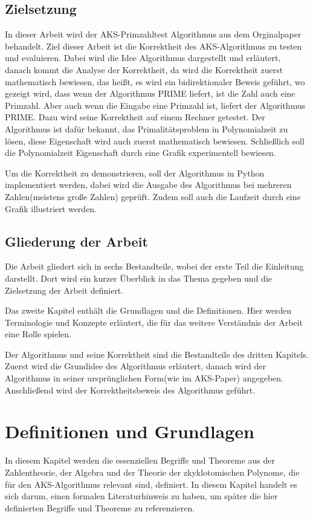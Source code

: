 \documentclass[12pt,oneside]{article}
\theoremstyle{remark}
\theoremstyle{definition}
\begin{document}
\subsection{Zielsetzung}
In dieser Arbeit wird der AKS-Primzahltest Algorithmus aus dem Orginalpaper behandelt. Ziel dieser Arbeit ist die Korrektheit des AKS-Algorithmus zu testen und evaluieren. Dabei wird die Idee Algorithmus dargestellt und erläutert, danach kommt die Analyse der Korrektheit, da wird die Korrektheit zuerst mathematisch bewiesen, das heißt, es wird ein bidirektionaler Beweis geführt, wo gezeigt wird, dass wenn der Algorithmus PRIME liefert, ist die Zahl auch eine Primzahl. Aber auch wenn die Eingabe eine Primzahl ist, liefert der Algorithmus PRIME. Dazu wird seine Korrektheit auf einem Rechner getestet. Der Algorithmus ist dafür bekannt, das Primalitätsproblem in Polynomialzeit zu lösen, diese Eigenschaft wird auch zuerst mathematisch bewiesen. Schließlich soll die Polynomialzeit Eigenschaft durch eine Grafik experimentell bewiesen.  

Um die Korrektheit zu demonstrieren, soll der Algorithmus in Python implementiert werden, dabei wird die Ausgabe des Algorithmus bei mehreren Zahlen(meistens große Zahlen) geprüft. Zudem soll auch die Laufzeit durch eine Grafik illustriert werden.  


\subsection{Gliederung der Arbeit}
Die Arbeit gliedert sich in sechs Bestandteile, wobei der
erste Teil die Einleitung darstellt. Dort wird ein kurzer Überblick in das Thema gegeben und die Zielsetzung der Arbeit definiert.

Das zweite Kapitel enthält die Grundlagen und die Definitionen. Hier werden Terminologie und Konzepte erläutert, die für das weitere Verständnis der Arbeit eine Rolle spielen. 

Der Algorithmus und seine Korrektheit sind die Bestandteile des dritten Kapitels. Zuerst wird die Grundidee des Algorithmus erläutert, danach wird der Algorithmus in seiner ursprünglichen Form(wie im AKS-Paper) angegeben. Anschließend wird der Korrektheitsbeweis des Algorithmus geführt. 
  

\section{Definitionen und Grundlagen}
In diesem Kapitel werden die essenziellen Begriffe und Theoreme aus der Zahlentheorie, der Algebra und der Theorie der zkyklotomischen Polynome, die für den AKS-Algorithmus relevant sind, definiert. In diesem Kapitel handelt es sich darum, einen formalen Literaturhinweis zu haben, um später die hier definierten Begriffe und Theoreme zu referenzieren.
\end{document}

